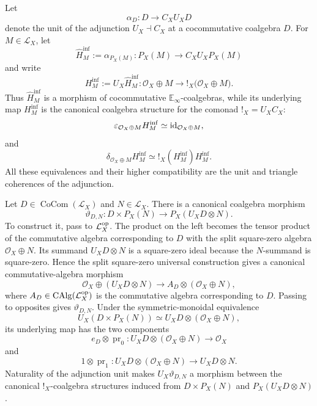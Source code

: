 \begin{construction}
\label{con:tangent-infinitesimal-augmentation}
Let
\[
    \alpha_D:
    D\longrightarrow C_XU_XD
\]
denote the unit of the adjunction \(U_X\dashv C_X\) at a cocommutative
coalgebra \(D\). For \(M\in\mathcal L_X\), let
\[
    \widehat H^{\inf}_M
    :=
    \alpha_{P_X(M)}:
    P_X(M)\longrightarrow C_XU_XP_X(M)
\]
and write
\[
    H^{\inf}_M
    :=
    U_X\widehat H^{\inf}_M:
    \mathcal O_X\oplus M
    \longrightarrow
    !_X\bigl(\mathcal O_X\oplus M\bigr).
\]
Thus \(\widehat H^{\inf}_M\) is a morphism of cocommutative
\(\mathbb E_\infty\)-coalgebras, while its underlying map \(H^{\inf}_M\)
is the canonical coalgebra structure for the comonad \(!_X=U_XC_X\):
\[
    \varepsilon_{\mathcal O_X\oplus M}H^{\inf}_M
    \simeq
    \operatorname{id}_{\mathcal O_X\oplus M},
\]
and
\[
    \delta_{\mathcal O_X\oplus M}H^{\inf}_M
    \simeq
    !_X(H^{\inf}_M)H^{\inf}_M.
\]
All these equivalences and their higher compatibility are the unit and
triangle coherences of the adjunction.
\end{construction}

\begin{construction}
\label{con:primitive-tensor-comparison}
Let \(D\in\operatorname{CoCom}(\mathcal L_X)\) and \(N\in\mathcal L_X\).
There is a canonical coalgebra morphism
\[
    \vartheta_{D,N}:
    D\times P_X(N)
    \longrightarrow
    P_X(U_XD\otimes N).
\]
To construct it, pass to \(\mathcal L_X^{\mathrm{op}}\). The product on the left
becomes the tensor product of the commutative algebra corresponding to \(D\)
with the split square-zero algebra \(\mathcal O_X\oplus N\). Its summand
\(U_XD\otimes N\) is a square-zero ideal because the \(N\)-summand is
square-zero. Hence the split square-zero universal construction gives a
canonical commutative-algebra morphism
\[
    \mathcal O_X\oplus(U_XD\otimes N)
    \longrightarrow
    A_D\otimes(\mathcal O_X\oplus N),
\]
where \(A_D\in\operatorname{CAlg}(\mathcal L_X^{\mathrm{op}})\) is the commutative algebra
corresponding to \(D\). Passing to opposites gives \(\vartheta_{D,N}\).
Under the symmetric-monoidal equivalence
\[
    U_X(D\times P_X(N))
    \simeq
    U_XD\otimes(\mathcal O_X\oplus N),
\]
its underlying map has the two components
\[
    e_D\otimes\operatorname{pr}_0
    :U_XD\otimes(\mathcal O_X\oplus N)\longrightarrow\mathcal O_X
\]
and
\[
    1\otimes\operatorname{pr}_1
    :U_XD\otimes(\mathcal O_X\oplus N)\longrightarrow U_XD\otimes N.
\]
Naturality of the adjunction unit makes \(U_X\vartheta_{D,N}\) a morphism between
the canonical \(!_X\)-coalgebra structures induced from \(D\times P_X(N)\)
and \(P_X(U_XD\otimes N)\).
\end{construction}

